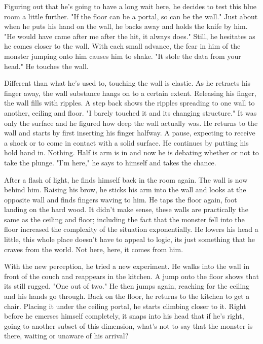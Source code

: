         Figuring out that he's going to have a long wait here, he decides to test this blue room a little further. "If the floor can be a portal,
    so can be the wall." Just about when he puts his hand on the wall, he backs away and holds the knife by him. "He would have came after me
    after the hit, it always does." Still, he hesitates as he comes closer to the wall. With each small advance, the fear in him of the monster
    jumping onto him causes him to shake. "It stole the data from your head." He touches the wall.

        Different than what he's used to, touching the wall is elastic. As he retracts his finger away, the wall substance hangs on to a certain
    extent. Releasing his finger, the wall fills with ripples. A step back shows the ripples spreading to one wall to another, ceiling and floor.
    "I barely touched it and its changing structure." It was only the surface and he figured how deep the wall actually was. He returns to the
    wall and starts by first inserting his finger halfway. A pause, expecting to receive a shock or to come in contact with a solid surface. He
    continues by putting his hold hand in. Nothing. Half is arm is in and now he is debating whether or not to take the plunge. "I'm here," he
    says to himself and takes the chance.

        After a flash of light, he finds himself back in the room again. The wall is now behind him. Raising his brow, he sticks his arm into
    the wall and looks at the opposite wall and finds fingers waving to him. He taps the floor again, foot landing on the hard wood. It didn't
    make sense, these walls are practically the same as the ceiling and floor; including the fact that the monster fell into the floor increased
    the complexity of the situation exponentially. He lowers his head a little, this whole place doesn't have to appeal to logic, its just
    something that he craves from the world. Not here, here, it comes from him.

        With the new perception, he tried a new experiment. He walks into the wall in front of the couch and reappears in the kitchen. A jump
    onto the floor shows that its still rugged. "One out of two." He then jumps again, reaching for the ceiling and his hands go through. Back
    on the floor, he returns to the kitchen to get a chair. Placing it under the ceiling portal, he starts climbing closer to it. Right before
    he emerses himself completely, it snaps into his head that if he's right, going to another subset of this dimension, what's not to say
    that the monster is there, waiting or unaware of his arrival?

